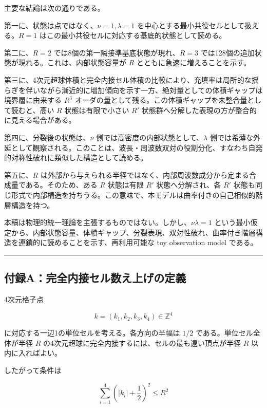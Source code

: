 \documentclass[
]{ltjsarticle}
\begin{document}
主要な結論は次の通りである。

第一に、状態は点ではなく、\(\nu=1,\lambda=1\)
を中心とする最小共役セルとして扱える。\(R=1\)
はこの最小共役セルに対応する基底的状態として読める。

第二に、\(R=2\) では8個の第一隣接準基底状態が現れ、\(R=3\)
では128個の追加状態が現れる。これは、内部状態容量が \(R\)
とともに急速に増えることを示す。

第三に、4次元超球体積と完全内接セル体積の比較により、充填率は局所的な揺らぎを伴いながら漸近的に増加傾向を示す一方、絶対量としての体積ギャップは境界層に由来する
\(R^3\)
オーダの量として残る。この体積ギャップを未整合量として読むと、高い \(R\)
状態は有限で小さい \(R'\)
状態群へ分解した表現の方が整合的に見える場合がある。

第四に、分裂後の状態は、\(\nu\)
側では高密度の内部状態として、\(\lambda\)
側では希薄な外延として観察される。このことは、波長・周波数双対の役割分化、すなわち自発的対称性破れに類似した構造として読める。

第五に、\(R\)
は外部から与えられる半径ではなく、内部周波数成分から定まる合成量である。そのため、ある
\(R\) 状態は有限 \(R'\) 状態へ分解され、各 \(R'\)
状態も同じ形式で内部構造を持ちうる。この意味で、本モデルは曲率付きの自己相似的階層構造を持つ。

本稿は物理的統一理論を主張するものではない。しかし、\(\nu\lambda=1\)
という最小仮定から、内部状態容量、体積ギャップ、分裂表現、双対性破れ、曲率付き階層構造を連鎖的に読めることを示す、再利用可能な
toy observation model である。

\begin{center}\rule{0.5\linewidth}{0.5pt}\end{center}

\subsection{付録A：完全内接セル数え上げの定義}\label{ux4ed8ux9332aux5b8cux5168ux5185ux63a5ux30bbux30ebux6570ux3048ux4e0aux3052ux306eux5b9aux7fa9}

4次元格子点

\[
k=(k_1,k_2,k_3,k_4)\in\mathbb{Z}^4
\]

に対応する一辺1の単位セルを考える。各方向の半幅は \(1/2\)
である。単位セル全体が半径 \(R\)
の4次元超球に完全内接するには、セルの最も遠い頂点が半径 \(R\)
以内に入ればよい。

したがって条件は

\[
\sum_{i=1}^{4}\left(|k_i|+\frac12\right)^2\le R^2
\]
\end{document}
